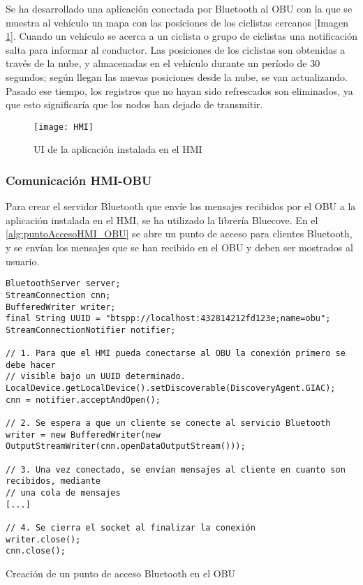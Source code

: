 Se ha desarrollado una aplicación conectada por Bluetooth al OBU con la que se muestra al vehículo un mapa con las posiciones de los ciclistas cercanos [Imagen \ref{figure:HMI}]. Cuando un vehículo se acerca a un ciclista o grupo de ciclistas una notificación salta para informar al conductor. Las posiciones de los ciclistas son obtenidas a través de la nube, y almacenadas en el vehículo durante un período de 30 segundos; según llegan las nuevas posiciones desde la nube, se van actualizando. Pasado ese tiempo, los registros que no hayan sido refrescados son eliminados, ya que esto significaría que los nodos han dejado de transmitir.
	
\begin{figure}[H]
	\begin{center}
	\texttt{[image: HMI]}
	\caption{UI de la aplicación instalada en el HMI}
	\label{figure:HMI}
\end{center}
\end{figure}
	
\subsubsection{Comunicación HMI-OBU}
Para crear el servidor Bluetooth que envíe los mensajes recibidos por el OBU a la aplicación instalada en el HMI, se ha utilizado la librería Bluecove. En el \ref{alg:puntoAccesoHMI_OBU} se abre un punto de acceso para clientes Bluetooth, y se envían los mensajes que se han recibido en el OBU y deben ser mostrados al usuario.

\begin{listing}
	\begin{minipage}{.4\textwidth}
		\begin{verbatim}
BluetoothServer server;
StreamConnection cnn;
BufferedWriter writer;
final String UUID = "btspp://localhost:432814212fd123e;name=obu";
StreamConnectionNotifier notifier;
					
// 1. Para que el HMI pueda conectarse al OBU la conexión primero se debe hacer
// visible bajo un UUID determinado.
LocalDevice.getLocalDevice().setDiscoverable(DiscoveryAgent.GIAC);
cnn = notifier.acceptAndOpen();					
					
// 2. Se espera a que un cliente se conecte al servicio Bluetooth
writer = new BufferedWriter(new OutputStreamWriter(cnn.openDataOutputStream()));
					
// 3. Una vez conectado, se envían mensajes al cliente en cuanto son recibidos, mediante
// una cola de mensajes
[...]
					
// 4. Se cierra el socket al finalizar la conexión
writer.close();
cnn.close();
		\end{verbatim}
	\end{minipage}
\caption{Creación de un punto de acceso Bluetooth en el OBU}\label{alg:puntoAccesoHMI_OBU}
\end{listing}
